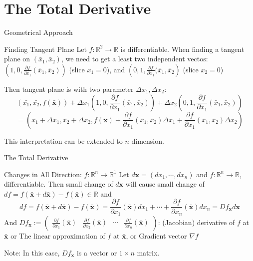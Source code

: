 \documentclass[a4paper,11pt]{article}
\newcommand{\bb}{\mathbb}
\newcommand{\bd}{\mathbf}
\newcommand{\p}{\partial}
\begin{document}
\section{The Total Derivative} %
\label{sec:the_total_derivative}

\begin{frame}[t]{Geometrical Approach}
	\begin{block}{Finding Tangent Plane}
		Let $f:\bb{R}^2\rightarrow \bb{R}$ is differentiable. When finding a tangent plane on $(\bar x_1, \bar x_2)$, we need to get a least two independent vectos: $\left(1,0,\frac{\p f}{\p x_1}(\bar x_1, \bar x_2)\right)$ (slice $x_1=0$), and $\left(0,1,\frac{\p f}{\p x_1}(\bar x_1, \bar x_2\right)$ (slice $x_2=0$)
		
		Then tangent plane is with two parameter $\Delta x_1, \Delta x_2$:\[
			(\bar {x_1}, \bar{x_2}, f(\bar {\bd x})) + \Delta x_1\left(1,0,\frac{\p f}{\p x_1}(\bar x_1, \bar x_2) \right)+\Delta x_2\left(0,1,\frac{\p f}{\p x_1}(\bar x_1, \bar x_2)\right)
		\]\[
			=\left(\bar{ x_1}+\Delta x_1 , \bar{x_2}+\Delta x_2, f(\bar {\bd x})+ \frac{\p f}{\p x_1}(\bar x_1, \bar x_2)\Delta x_1 + \frac{\p f}{\p x_1}(\bar x_1, \bar x_2)\Delta x_2 \right)
		\]
	\end{block}
	This interpretation can be extended to $n$ dimension.
\end{frame}

\begin{frame}[t]{The Total Derivative}
	\begin{block}
		{Changes in All Direction: $f:\bb{R}^n\rightarrow \bb{R}^1$}
		Let $d \bd x = (d x_1, \cdots, d x_n)$ and $f:\bb{R}^n\rightarrow\bb{R}$, differentiable. Then small change of $d\bd x$ will cause small change of $df=f(\bar{\bd x} + d \bar{\bd x}) - f(\bar{\bd x})\in\bb{R}$ and \[
			df = f(\bar{\bd x} + d \bar{\bd x}) - f(\bar{\bd x}) = \frac{\p f}{\p x_1}(\bar{\bd x})dx_1 + \cdots +\frac{\p f}{\p x_n}(\bar{\bd x})dx_n= Df_{\bd x} d\bd x
		\]
		And $Df_{\bd x}:=\begin{pmatrix}
			\frac{\p f}{\p x_1}(\bar{\bd x}) & \frac{\p f}{\p x_2}(\bar{\bd x}) &\cdots & \frac{\p f}{\p x_n}(\bar{\bd x})
		\end{pmatrix}$: (Jacobian) derivative of $f$ at $\bar{\bd x}$ or The linear approximation of $f$ at $\bar{\bd x}$, or Gradient vector $\nabla f$
	\end{block}
	Note: In this case, $Df_{\bd x}$ is a vector or $1\times n$ matrix.
\end{frame}
\end{document}
